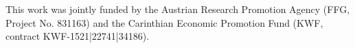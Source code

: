 This work was jointly funded by the Austrian Research Promotion Agency (FFG, Project No. 831163) and the Carinthian Economic Promotion Fund (KWF, contract KWF-1521|22741|34186).
